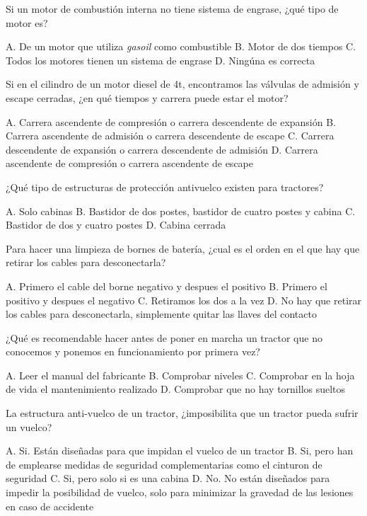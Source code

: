 \documentclass[answers,11pt]{exam}
\begin{document}
{\begin{questions}
\question Si un motor de combustión interna no tiene sistema de engrase, ¿qué tipo de motor es?
\begin{checkboxes}
\choice A. De un motor que utiliza \emph{gasoil} como combustible
\CorrectChoice B. Motor de dos tiempos
\choice C. Todos los motores tienen un sistema de engrase
\choice D. Ningúna es correcta
\end{checkboxes}

\question Si en el cilindro de un motor diesel de 4t, encontramos las válvulas
  de admisión y escape cerradas, ¿en  qué tiempos y carrera puede estar el
  motor? 
\begin{checkboxes}
\CorrectChoice A. Carrera ascendente de compresión o carrera descendente de expansión 
\choice B. Carrera ascendente de admisión o carrera descendente de escape
\choice C. Carrera descendente de expansión o carrera descendente de admisión
\choice D. Carrera ascendente de compresión o carrera ascendente de escape
\end{checkboxes}

\question ¿Qué tipo de estructuras de protección antivuelco existen para tractores?
\begin{checkboxes}
\choice A. Solo cabinas
\CorrectChoice B. Bastidor de dos postes, bastidor de cuatro postes y cabina
\choice C. Bastidor de dos y cuatro postes
\choice D. Cabina cerrada
\end{checkboxes}
\newpage
\question Para hacer una limpieza de bornes de batería, ¿cual es el orden en el
  que hay que retirar los cables para desconectarla? 
\begin{checkboxes}
\CorrectChoice A. Primero el cable del borne negativo y despues el positivo
\choice B. Primero el positivo y despues el negativo
\choice C. Retiramos los dos a la vez
\choice D. No hay que retirar los cables para desconectarla, simplemente quitar
las llaves del contacto 
\end{checkboxes}

\question ¿Qué es recomendable hacer antes de poner en marcha un tractor que no
  conocemos y ponemos en funcionamiento por primera vez? 
\begin{checkboxes}
\CorrectChoice A. Leer el manual del fabricante
\choice B. Comprobar niveles
\choice C. Comprobar en la hoja de vida el mantenimiento realizado
\choice D. Comprobar que no hay tornillos sueltos
\end{checkboxes}

\question La estructura anti-vuelco de un tractor, ¿imposibilita que un tractor
  pueda sufrir un vuelco? 
\begin{checkboxes}
\choice A. Si. Están diseñadas para que impidan el vuelco de un tractor
\choice B. Si, pero han de emplearse medidas de seguridad complementarias como
el cinturon de seguridad
\choice C. Si, pero solo si es una cabina
\CorrectChoice D. No. No están diseñados para impedir la posibilidad de vuelco,
solo para minimizar la gravedad de las lesiones en caso de accidente 
\end{checkboxes}


\end{questions}}
\end{document}

